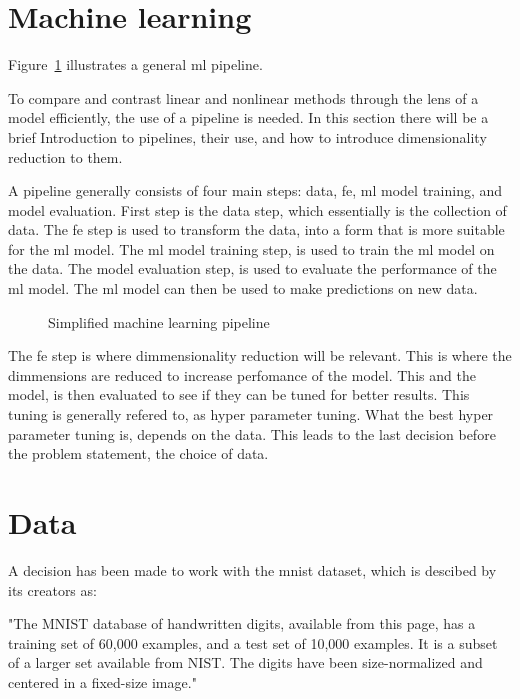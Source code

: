 \section{Machine learning}\label{sec:machine-learning}

Figure~\ref{fig:basic-machine-learning-pipeline} illustrates a general \gls{ml} pipeline.

To compare and contrast linear and nonlinear methods through the lens of a model efficiently, the use of a pipeline is needed. In this section there will be a brief Introduction to pipelines, their use, and how to introduce dimensionality reduction to them.

A pipeline generally consists of four main steps: data, \gls{fe}, \gls{ml} model training, and model evaluation. First step is the data step, which essentially is the collection of data. The \gls{fe} step is used to transform the data, into a form that is more suitable for the \gls{ml} model. The \gls{ml} model training step, is used to train the \gls{ml} model on the data. The model evaluation step, is used to evaluate the performance of the \gls{ml} model. The \gls{ml} model can then be used to make predictions on new data. 

\begin{figure}[htb!]
    \centering
        
    \caption{Simplified machine learning pipeline}
    \label{fig:basic-machine-learning-pipeline}
 \end{figure}

The \gls{fe} step is where dimmensionality reduction will be relevant. This is where the dimmensions are reduced to increase perfomance of the model. This and the model, is then evaluated to see if they can be tuned for better results. This tuning is generally refered to, as hyper parameter tuning. What the best hyper parameter tuning is, depends on the data. This leads to the last decision before the problem statement, the choice of data.

\section*{Data}

A decision has been made to work with the mnist dataset, which is descibed by its creators as:

"The MNIST database of handwritten digits, available from this page, has a training set of 60,000 examples, and a test set of 10,000 examples. It is a subset of a larger set available from NIST. The digits have been size-normalized and centered in a fixed-size image."\cite{lecun-mnist-database}

